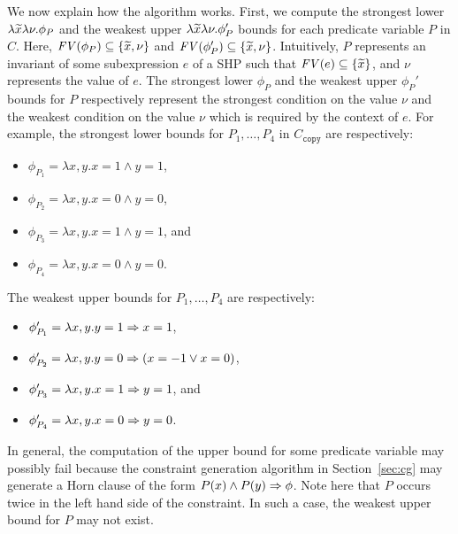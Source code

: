 We now explain how the algorithm works.  First, we compute the strongest 
lower \(\lambda \widetilde{x}\lambda \nu.\phi_P\) and the weakest upper 
\(\lambda \widetilde{x}\lambda \nu.\phi_P'\) bounds for each predicate 
variable \(P\) in \(C\).  Here, \(\mathit{FV}({\phi_P}) \subseteq 
\{{\widetilde{x},\nu}\}\) and \(\mathit{FV}({\phi_P'}) \subseteq \{{\widetilde{x},\nu}\}\).  
Intuitively, \(P\) represents an invariant of some subexpression \(e\) 
of a SHP such that \(\mathit{FV}({e}) \subseteq \{{\widetilde{x}}\}\), and \(\nu\) 
represents the value of \(e\).  The strongest lower \(\phi_P\) and the 
weakest upper \(\phi_{P}'\) bounds for \(P\) respectively represent the 
strongest condition on the value \(\nu\) and the weakest condition on 
the value \(\nu\) which is required by the context of \(e\).  For 
example, the strongest lower bounds for \(P_1,\dots,P_4\) in 
\(C_{\texttt{copy}}\) are respectively:
\begin{itemize}
\item \(\phi_{P_1}=\lambda x,y.x=1 \land y=1\), 
\item \(\phi_{P_2}=\lambda x,y.x=0 \land y=0\),
\item \(\phi_{P_3}=\lambda x,y.x=1 \land y=1\), and 
\item \(\phi_{P_4}=\lambda x,y.x=0 \land y=0\).
\end{itemize}
The weakest upper bounds for \(P_1,\dots,P_4\) are respectively:
\begin{itemize}
\item \(\phi_{P_1}'=\lambda x,y.y=1 \Rightarrow x=1\), 
\item \(\phi_{P_2}'=\lambda x,y.y=0 \Rightarrow (x=-1 \lor x=0)\),
\item \(\phi_{P_3}'=\lambda x,y.x=1 \Rightarrow y=1\), and 
\item \(\phi_{P_4}'=\lambda x,y.x=0 \Rightarrow y=0\).
\end{itemize}

In general, the computation of the upper bound for some predicate 
variable may possibly fail because the constraint generation algorithm 
in Section~\ref{sec:cg} may generate a Horn clause of the form \(P(x) 
\land P(y) \Rightarrow \phi\).  Note here that \(P\) occurs twice in the left 
hand side of the constraint.  In such a case, the weakest upper bound 
for \(P\) may not exist.

